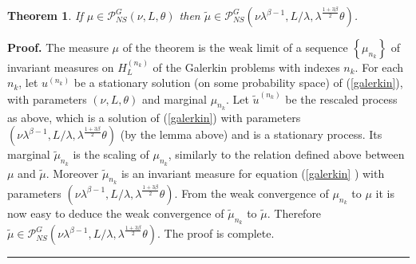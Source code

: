 \documentclass[11pt]{preprint}
\newtheorem{theorem}{Theorem}[section]
\newenvironment{proof}[1][Proof]{\textbf{#1.} }{\ \rule{0.5em}{0.5em}}
\begin{document}
\begin{theorem}
\label{appendixtheoremscaling}\bigskip If $\mu\in\mathcal{P}_{NS}^{G}\left(
\nu,L,\theta\right)  $ then $\widetilde{\mu}\in\mathcal{P}_{NS}^{G}\left(
\nu\lambda^{\beta-1},L/\lambda,\lambda^{\frac{1+3\beta}{2}}\theta\right)  $.
\end{theorem}

\begin{proof}
The measure $\mu$ of the theorem is the weak limit of a sequence $\left\{
\mu_{n_{k}}\right\}  $ of invariant measures on $H_L^{\left(  n_{k}\right)
} $ of the Galerkin problems with indexes $n_{k}$. For each $n_{k}$, let
$u^{\left(  n_{k}\right)  }$ be a stationary solution (on some probability
space) of (\ref{galerkin}), with parameters $\left(  \nu,L,\theta\right)  $
and marginal $\mu_{n_{k}}$. Let $\widetilde{u}^{\left(  n_{k}\right)  }$ be
the rescaled process as above, which is a solution of (\ref{galerkin}) with
parameters $\left(  \nu\lambda^{\beta-1},L/\lambda,\lambda^{\frac{1+3\beta}%
{2}}\theta\right)  $ (by the lemma above) and is a stationary process. Its
marginal $\widetilde{\mu}_{n_{k}}$ is the scaling of $\mu_{n_{k}}$, similarly
to the relation defined above between $\mu$ and $\widetilde{\mu}$. Moreover
$\widetilde{\mu}_{n_{k}}$ is an invariant measure for equation (\ref{galerkin}%
) with parameters $\left(  \nu\lambda^{\beta-1},L/\lambda,\lambda
^{\frac{1+3\beta}{2}}\theta\right)$. From the weak convergence of
$\mu_{n_{k}}$ to $\mu$ it is now easy to deduce the weak convergence of
$\widetilde{\mu}_{n_{k}}$ to $\widetilde{\mu}$. Therefore $\widetilde{\mu}%
\in\mathcal{P}_{NS}^{G}\left(  \nu\lambda^{\beta-1},L/\lambda,\lambda
^{\frac{1+3\beta}{2}}\theta\right)  $. The proof is complete.
\end{proof}

%
%
\end{document}
